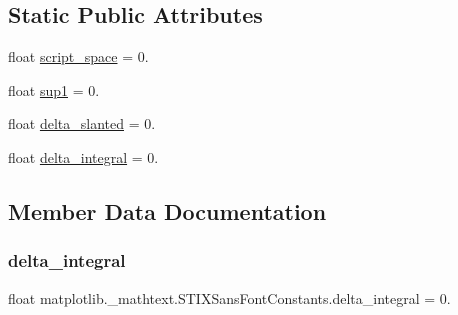 \subsection*{Static Public Attributes}
\begin{DoxyCompactItemize}
\item 
float \hyperlink{classmatplotlib_1_1__mathtext_1_1STIXSansFontConstants_ab926aa45f9686fe42fcb38a82e60a72a}{script\+\_\+space} = 0.
\item 
float \hyperlink{classmatplotlib_1_1__mathtext_1_1STIXSansFontConstants_ab8f75ab3e0b3715f31dfcb7673676162}{sup1} = 0.
\item 
float \hyperlink{classmatplotlib_1_1__mathtext_1_1STIXSansFontConstants_a5d8367e7f121b80fe136f4262c83cf89}{delta\+\_\+slanted} = 0.
\item 
float \hyperlink{classmatplotlib_1_1__mathtext_1_1STIXSansFontConstants_a3f57ea5d87010154e6318173dcd65670}{delta\+\_\+integral} = 0.
\end{DoxyCompactItemize}


\subsection{Member Data Documentation}
\mbox{\label{classmatplotlib_1_1__mathtext_1_1STIXSansFontConstants_a3f57ea5d87010154e6318173dcd65670}} 
\subsubsection{\texorpdfstring{delta\+\_\+integral}{delta\_integral}}
{\footnotesize\ttfamily float matplotlib.\+\_\+mathtext.\+S\+T\+I\+X\+Sans\+Font\+Constants.\+delta\+\_\+integral = 0.\hspace{0.3cm}{\ttfamily [static]}}

\mbox{\label{classmatplotlib_1_1__mathtext_1_1STIXSansFontConstants_a5d8367e7f121b80fe136f4262c83cf89}} 

